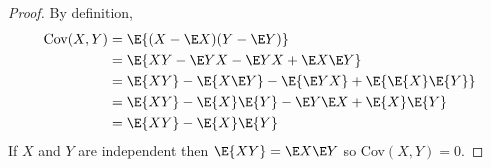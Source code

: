 \documentclass{article}
\begin{document}
\begin{aprob}
\begin{enumerate}
            \begin{proof}
                By definition,
                \begin{align*}
                        \text{Cov}(X,Y) & =  \E {(X-\E X)(Y-\E Y)} \\
                                 & =  \E {XY -\E Y X - \E Y X +\E X \E Y} \\
                                 & =  \E {XY} - \E {X \E Y} - \E {\E Y X} + \E {\E {X} \E {Y}} \\
                                 & =  \E {XY} - \E {X} \E {Y} - \E Y \E X + {\E {X} \E {Y}} \\
                                 & =  \E {XY} - \E {X} \E {Y}
                \end{align*}
                If $X$ and $Y$ are independent then $\E {XY} = \E X \E Y$ so Cov$(X,Y) = 0$.
            \end{proof}
    \end{enumerate}

\end{aprob}
\end{document}
